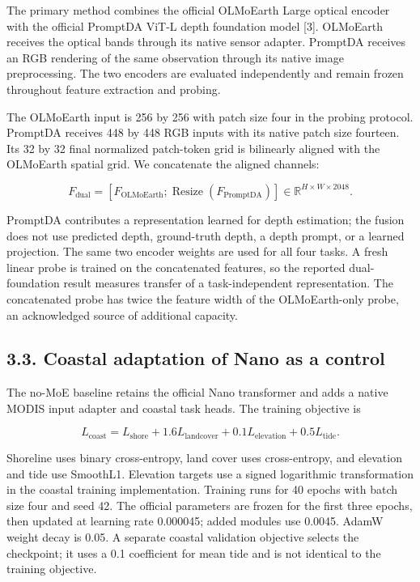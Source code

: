 \documentclass[
  10pt,
  english,
]{article}
\begin{document}
The primary method combines the official OLMoEarth Large optical encoder
with the official PromptDA ViT-L depth foundation model {[}3{]}.
OLMoEarth receives the optical bands through its native sensor adapter.
PromptDA receives an RGB rendering of the same observation through its
native image preprocessing. The two encoders are evaluated independently
and remain frozen throughout feature extraction and probing.

The OLMoEarth input is 256 by 256 with patch size four in the probing
protocol. PromptDA receives 448 by 448 RGB inputs with its native patch
size fourteen. Its 32 by 32 final normalized patch-token grid is
bilinearly aligned with the OLMoEarth spatial grid. We concatenate the
aligned channels:

\[
F_{\mathrm{dual}}=[F_{\mathrm{OLMoEarth}};\operatorname{Resize}(F_{\mathrm{PromptDA}})]\in\mathbb{R}^{H\times W\times 2048}.
\]

PromptDA contributes a representation learned for depth estimation; the
fusion does not use predicted depth, ground-truth depth, a depth prompt,
or a learned projection. The same two encoder weights are used for all
four tasks. A fresh linear probe is trained on the concatenated
features, so the reported dual-foundation result measures transfer of a
task-independent representation. The concatenated probe has twice the
feature width of the OLMoEarth-only probe, an acknowledged source of
additional capacity.

\hypertarget{coastal-adaptation-of-nano-as-a-control}{%
\subsection{3.3. Coastal adaptation of Nano as a
control}\label{coastal-adaptation-of-nano-as-a-control}}

The no-MoE baseline retains the official Nano transformer and adds a
native MODIS input adapter and coastal task heads. The training
objective is

\[
L_{\mathrm{coast}}=L_{\mathrm{shore}}+1.6L_{\mathrm{landcover}}+0.1L_{\mathrm{elevation}}+0.5L_{\mathrm{tide}}.
\]

Shoreline uses binary cross-entropy, land cover uses cross-entropy, and
elevation and tide use SmoothL1. Elevation targets use a signed
logarithmic transformation in the coastal training implementation.
Training runs for 40 epochs with batch size four and seed 42. The
official parameters are frozen for the first three epochs, then updated
at learning rate 0.000045; added modules use 0.0045. AdamW weight decay
is 0.05. A separate coastal validation objective selects the checkpoint;
it uses a 0.1 coefficient for mean tide and is not identical to the
training objective.
\end{document}
